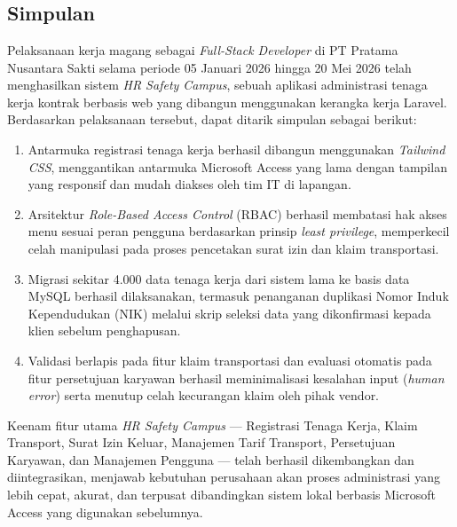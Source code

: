 \chapter{\babEmpat}
\section{Simpulan}

Pelaksanaan kerja magang sebagai \textit{Full-Stack Developer} di PT Pratama
Nusantara Sakti selama periode 05 Januari 2026 hingga 20 Mei 2026 telah
menghasilkan sistem \textit{HR Safety Campus}, sebuah aplikasi administrasi
tenaga kerja kontrak berbasis web yang dibangun menggunakan kerangka kerja
Laravel. Berdasarkan pelaksanaan tersebut, dapat ditarik simpulan sebagai
berikut:

\begin{enumerate}
    \item Antarmuka registrasi tenaga kerja berhasil dibangun menggunakan
    \textit{Tailwind CSS}, menggantikan antarmuka Microsoft Access yang lama
    dengan tampilan yang responsif dan mudah diakses oleh tim IT di lapangan.

    \item Arsitektur \textit{Role-Based Access Control} (RBAC) berhasil
    membatasi hak akses menu sesuai peran pengguna berdasarkan prinsip
    \textit{least privilege}, memperkecil celah manipulasi pada proses
    pencetakan surat izin dan klaim transportasi.

    \item Migrasi sekitar 4.000 data tenaga kerja dari sistem lama ke basis
    data MySQL berhasil dilaksanakan, termasuk penanganan duplikasi Nomor Induk
    Kependudukan (NIK) melalui skrip seleksi data yang dikonfirmasi kepada
    klien sebelum penghapusan.

    \item Validasi berlapis pada fitur klaim transportasi dan evaluasi
    otomatis pada fitur persetujuan karyawan berhasil meminimalisasi kesalahan
    input (\textit{human error}) serta menutup celah kecurangan klaim oleh
    pihak vendor.
\end{enumerate}

Keenam fitur utama \textit{HR Safety Campus} --- Registrasi Tenaga Kerja,
Klaim Transport, Surat Izin Keluar, Manajemen Tarif Transport, Persetujuan
Karyawan, dan Manajemen Pengguna --- telah berhasil dikembangkan dan
diintegrasikan, menjawab kebutuhan perusahaan akan proses administrasi yang
lebih cepat, akurat, dan terpusat dibandingkan sistem lokal berbasis Microsoft
Access yang digunakan sebelumnya.

